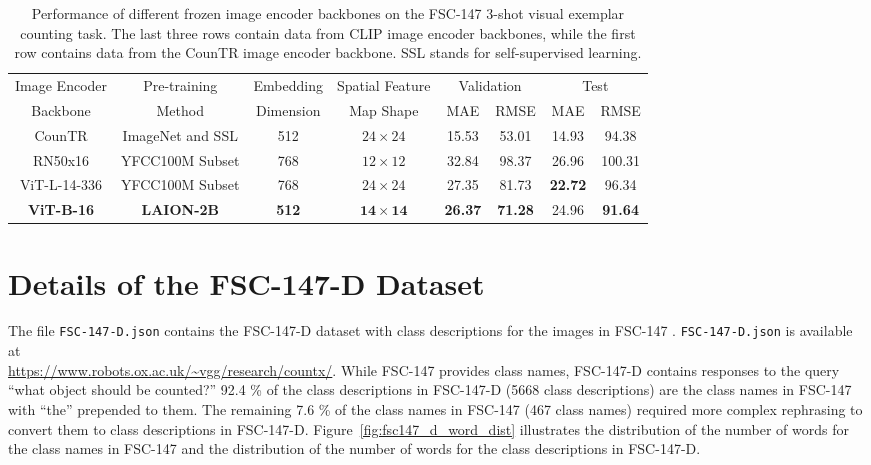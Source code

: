 \documentclass{bmvc2k}
\begin{document}
\begin{table}[h!]
\scriptsize
\begin{tabular}{|c|c|c|c|c|c|c|c|} 
  \hline
  Image Encoder & Pre-training & Embedding & Spatial Feature & \multicolumn{2}{|c|}{Validation} & \multicolumn{2}{|c|}{Test} \\
   Backbone &  Method &  Dimension &  Map Shape & MAE & RMSE & MAE & RMSE \\
   \hline
   CounTR \cite{Liu2022CounTRTG} & ImageNet and SSL & 512 & $24 \times 24$ & 15.53 & 53.01 & 14.93 & 94.38 \\
   \hline
   RN50x16 \cite{ilharco_gabriel_2021_5143773} & YFCC100M Subset \cite{Radford2021LearningTV} & 768 & $12 \times 12$ & 32.84 & 98.37 & 26.96 & 100.31\\
   ViT-L-14-336 \cite{ilharco_gabriel_2021_5143773} & YFCC100M Subset \cite{Radford2021LearningTV} & 768 & $24 \times 24$ & 27.35 & 81.73 & \textbf{22.72} & 96.34\\
   \textbf{ViT-B-16 \cite{ilharco_gabriel_2021_5143773}} & \textbf{LAION-2B \cite{schuhmann2022laionb}} & \textbf{512} & $\mathbf{14 \times 14}$ & \textbf{26.37} & \textbf{71.28} & 24.96 & \textbf{91.64}\\
  \hline
 \end{tabular}
 \caption{\label{backbone} Performance of different frozen image encoder backbones on the FSC-147 \cite{m_Ranjan-etal-CVPR21} 3-shot visual exemplar counting task. The last three rows contain data from CLIP image encoder backbones, while the first row contains data from the CounTR image encoder backbone. SSL stands for self-supervised learning.}
 \end{table}

\newpage \section{Details of the FSC-147-D Dataset}
\label{sec:fsc-147-d}
The file \texttt{FSC-147-D.json} contains the FSC-147-D dataset with class descriptions for the images in FSC-147 \cite{m_Ranjan-etal-CVPR21}. \texttt{FSC-147-D.json} is available at \\ \href{https://www.robots.ox.ac.uk/~vgg/research/countx/}{https://www.robots.ox.ac.uk/\textasciitilde vgg/research/countx/}.
While FSC-147 provides class names, FSC-147-D contains responses to the query ``what object should be counted?'' 92.4 \% of the class descriptions in FSC-147-D (5668 class descriptions) are the class names in FSC-147 with ``the'' prepended to them. The remaining 7.6 \% of the class names in FSC-147 (467 class names) required more complex rephrasing to convert them to class descriptions in FSC-147-D. Figure~\ref{fig:fsc147_d_word_dist} illustrates the distribution of the number of words for the class names in FSC-147 and the distribution of the number of words for the class descriptions in FSC-147-D.
\end{document}
